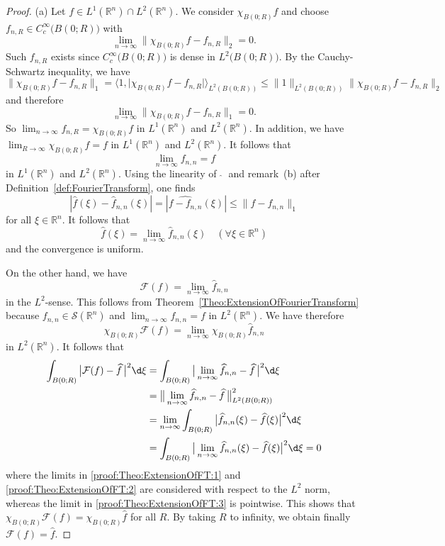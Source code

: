 \documentclass[12pt, oneside, a4paper]{article}
\theoremstyle{dfn}
\newcommand{\scalprod}[2]{\langle #1,#2 \rangle}
\def \S {\ensuremath{\mathcal{S}}}
\def \S {\ensuremath{\mathcal{S}}}
\def\Rbb{\ensuremath{\mathbb{R}}}
\providecommand{\norm}[1]{\lVert#1\rVert}
\providecommand{\normbig}[1]{\big\lVert#1\big\rVert}
\newcommand{\Fcal}{\mathcal{F}}
\providecommand{\abs}[1]{\lvert#1\rvert}
\providecommand{\absbig}[1]{\big\lvert#1\big\rvert}
\providecommand{\Abs}[1]{\left\lvert#1\right\rvert}
\begin{document}
\begin{proof}
(a) Let $f \in L^1(\Rbb^n) \cap L^2(\Rbb^n)$. We consider $\chi_{B(0;R)} f$ and choose $f_{n,R} \in C_c^\infty\big(B(0;R)\big)$ with
\[
\lim_{n \to \infty} \norm{\chi_{B(0;R)} f - f_{n,R}}_2 = 0.
\]
Such $f_{n,R}$ exists since $C_c^\infty\big(B(0;R)\big)$ is dense in $L^2\big(B(0;R)\big)$. By the Cauchy-Schwartz inequality, we have
\[
\norm{\chi_{B(0;R)} f - f_{n,R}}_1
= \scalprod{1}{\abs{\chi_{B(0;R)} f - f_{n,R}}}_{L^2(B(0;R))}
\leqslant \norm{1}_{L^2(B(0;R))} \norm{\chi_{B(0;R)} f - f_{n,R}}_2
\]
and therefore
\[
\lim_{n \to \infty} \norm{\chi_{B(0;R)} f - f_{n,R}}_1 = 0.
\]
So $\lim_{n\to\infty} f_{n,R} = \chi_{B(0;R)} f$ in $L^1(\Rbb^n)$ and $L^2(\Rbb^n)$. In addition, we have $\lim_{R \to \infty} \chi_{B(0;R)} f = f$ in $L^1(\Rbb^n)$ and $L^2(\Rbb^n)$. It follows that
\[
\lim_{n\to\infty} f_{n,n} = f
\]
in $L^1(\Rbb^n)$ and $L^2(\Rbb^n)$. Using the linearity of $\;\widehat{}\;$ and remark~(b) after Definition~\ref{def:FourierTransform}, one finds
\[
\Abs{\widehat{f}(\xi) - \widehat{f}_{n,n}(\xi)}
= \Abs{\widehat{f - f_{n,n}}(\xi)} \leqslant \norm{f - f_{n,n}}_1
\]
for all $\xi \in \Rbb^n$. It follows that
\[
\widehat{f}(\xi) = \lim_{n \to \infty} \widehat{f}_{n,n}(\xi) \quad (\forall \xi \in \Rbb^n)
\]
and the convergence is uniform.

On the other hand, we have
\[
\Fcal(f) = \lim_{n \to \infty} \widehat{f}_{n,n}
\]
in the $L^2$-sense. This follows from Theorem~\ref{Theo:ExtensionOfFourierTransform} because $f_{n,n} \in \S(\Rbb^n)$ and $\lim_{n \to \infty} f_{n,n} = f$ in $L^2(\Rbb^n)$. We have therefore
\[
\chi_{B(0;R)} \Fcal(f) = \lim_{n \to \infty} \chi_{B(0;R)} \widehat{f}_{n,n}
\]
in $L^2(\Rbb^n)$. It follows that
\begin{align}
	\int_{B(0;R)} \absbig{\Fcal(f) - \widehat{f} \,}^2 \d\xi
	&= \int_{B(0;R)} \absbig{ \lim_{n \to \infty} \widehat{f}_{n,n} - \widehat{f} \,}^2 \d\xi \label{proof:Theo:ExtensionOfFT:1} \\
	&= \normbig{\lim_{n \to \infty} \widehat{f}_{n,n} - \widehat{f} \,}^2_{L^2(B(0;R))} \label{proof:Theo:ExtensionOfFT:2} \\
	&= \lim_{n \to \infty} \int_{B(0;R)} \absbig{\widehat{f}_{n,n}(\xi) - \widehat{f}(\xi) }^2 \d\xi \nonumber \\
	&= \int_{B(0;R)} \absbig{\lim_{n \to \infty} \widehat{f}_{n,n}(\xi) - \widehat{f}(\xi) }^2 \d\xi = 0 \label{proof:Theo:ExtensionOfFT:3}
\end{align}
where the limits in \eqref{proof:Theo:ExtensionOfFT:1} and \eqref{proof:Theo:ExtensionOfFT:2} are considered with respect to the $L^2$ norm, whereas the limit in \eqref{proof:Theo:ExtensionOfFT:3} is pointwise. This shows that $\chi_{B(0;R)} \Fcal(f) = \chi_{B(0;R)} \widehat{f}$ for all $R$. By taking $R$ to infinity, we obtain finally $\Fcal(f) = \widehat{f}$.


\end{proof}
\end{document}
